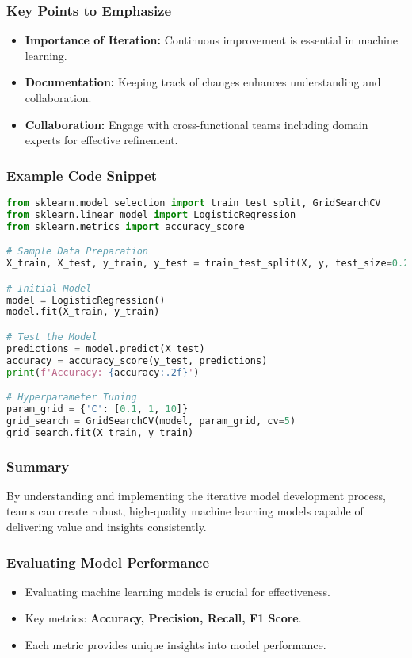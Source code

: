 \documentclass[aspectratio=169]{beamer}
\begin{document}
\begin{frame}[fragile]
    \frametitle{Key Points to Emphasize}
    \begin{itemize}
        \item \textbf{Importance of Iteration:} Continuous improvement is essential in machine learning.
        \item \textbf{Documentation:} Keeping track of changes enhances understanding and collaboration.
        \item \textbf{Collaboration:} Engage with cross-functional teams including domain experts for effective refinement.
    \end{itemize}
\end{frame}

\begin{frame}[fragile]
    \frametitle{Example Code Snippet}
    \begin{lstlisting}[language=Python]
from sklearn.model_selection import train_test_split, GridSearchCV
from sklearn.linear_model import LogisticRegression
from sklearn.metrics import accuracy_score

# Sample Data Preparation
X_train, X_test, y_train, y_test = train_test_split(X, y, test_size=0.2)

# Initial Model
model = LogisticRegression()
model.fit(X_train, y_train)

# Test the Model
predictions = model.predict(X_test)
accuracy = accuracy_score(y_test, predictions)
print(f'Accuracy: {accuracy:.2f}')

# Hyperparameter Tuning
param_grid = {'C': [0.1, 1, 10]}
grid_search = GridSearchCV(model, param_grid, cv=5)
grid_search.fit(X_train, y_train)
    \end{lstlisting}
\end{frame}

\begin{frame}[fragile]
    \frametitle{Summary}
    By understanding and implementing the iterative model development process, teams can create robust, high-quality machine learning models capable of delivering value and insights consistently.
\end{frame}

\begin{frame}[fragile]
    \frametitle{Evaluating Model Performance}
    \begin{itemize}
        \item Evaluating machine learning models is crucial for effectiveness.
        \item Key metrics: \textbf{Accuracy, Precision, Recall, F1 Score}.
        \item Each metric provides unique insights into model performance.
    \end{itemize}
\end{frame}
\end{document}
